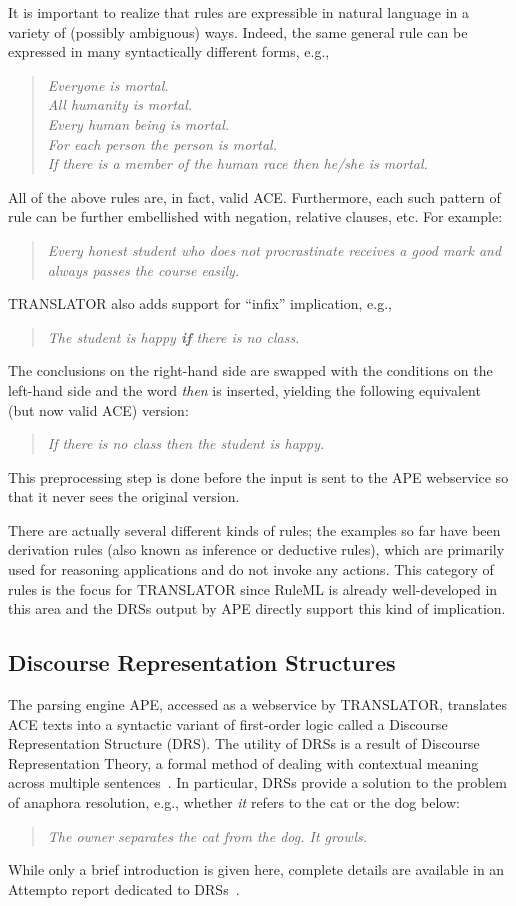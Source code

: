 \documentclass[12pt]{article}
\begin{document}
It is important to realize that rules are expressible in natural language in a variety of (possibly ambiguous) ways. Indeed, the same general rule can be expressed in many syntactically different forms, e.g.,
\begin{quote}
\textit{Everyone is mortal.\\
All humanity is mortal.\\
Every human being is mortal.\\
For each person the person is mortal.\\
If there is a member of the human race then he/she is mortal.}
\end{quote}
All of the above rules are, in fact, valid ACE. Furthermore, each such pattern of rule can be further embellished with negation, relative clauses, etc. For example:
\begin{quote}
\textit{Every honest student who does not procrastinate receives a good mark and always passes the course easily.}
\end{quote}
TRANSLATOR also adds support for ``infix'' implication, e.g.,
\begin{quote}
\textit{The student is happy \textbf{if} there is no class.}
\end{quote}
The conclusions on the right-hand side are swapped with the conditions on the left-hand side and the word \textit{then} is inserted, yielding the following equivalent (but now valid ACE) version:
\begin{quote}
\textit{If there is no class then the student is happy.}
\end{quote}
This preprocessing step is done before the input is sent to the APE webservice so that it never sees the original version.

There are actually several different kinds of rules; the examples so far have been derivation rules (also known as inference or deductive rules), which are primarily used for reasoning applications and do not invoke any actions. This category of rules is the focus for TRANSLATOR since RuleML is already well-developed in this area and the DRSs output by APE directly support this kind of implication.

\subsection{Discourse Representation Structures}

The parsing engine APE, accessed as a webservice by TRANSLATOR, translates ACE texts into a syntactic variant of first-order logic called a Discourse Representation Structure (DRS). The utility of DRSs is a result of Discourse Representation Theory, a formal method of dealing with contextual meaning across multiple sentences~\cite{kamp}. In particular, DRSs provide a solution to the problem of anaphora resolution, e.g., whether \textit{it} refers to the cat or the dog below:
\begin{quote}
\textit{The owner separates the cat from the dog. It growls.}
\end{quote}
While only a brief introduction is given here, complete details are available in an Attempto report dedicated to DRSs~\cite{drs}.
\end{document}
